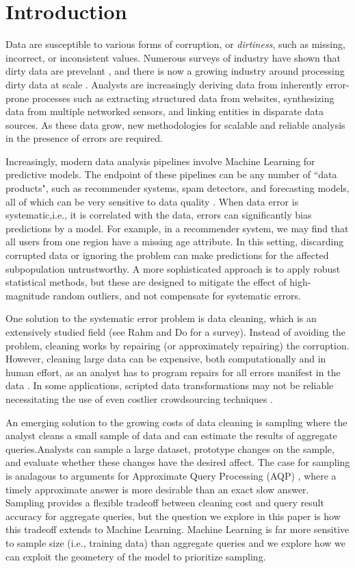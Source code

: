 \section{Introduction}
Data are susceptible to various forms of corruption, or \emph{dirtiness}, such as missing, incorrect, or inconsistent values.
Numerous surveys of industry have shown that dirty data are prevelant \cite{Gartner}, and there is now a growing industry around processing dirty data at scale \cite{fortunearticle}.
Analysts are increasingly deriving data from inherently error-prone processes such as extracting structured data from websites, synthesizing data from multiple networked sensors, and linking entities in disparate data sources.
As these data grow, new methodologies for scalable and reliable analysis in the presence of errors are required. 

Increasingly, modern data analysis pipelines involve Machine Learning for predictive models.
The endpoint of these pipelines can be any number of ``data products", such as recommender systems, spam detectors, and forecasting models, all of which can be very sensitive to data quality \cite{}.
When data error is systematic,i.e., it is correlated with the data, errors can significantly bias predictions by a model.
For example, in a recommender system, we may find that all users from one region have a missing age attribute.
In this setting, discarding corrupted data or ignoring the problem can make predictions for the affected subpopulation untrustworthy.
A more sophisticated approach is to apply robust statistical methods, but these are designed to mitigate the effect of high-magnitude random outliers, and not compensate for systematic errors.

One solution to the systematic error problem is data cleaning, which is an extensively studied field (see Rahm and Do \cite{rahm2000data} for a survey).
Instead of avoiding the problem, cleaning works by repairing (or approximately repairing) the corruption.
However, cleaning large data can be expensive, both computationally and in human effort, as an analyst has to program repairs for all errors manifest in the data \cite{kandel2012}.
In some applications, scripted data transformations may not be reliable necessitating the use of even costlier crowdsourcing techniques \cite{gokhale2014corleone,park2014crowdfill}.

An emerging solution to the growing costs of data cleaning is sampling \cite{wang1999sample} where the analyst cleans a small sample of data and can estimate the results of aggregate queries.Analysts can sample a large dataset, prototype changes on the sample, and evaluate whether these changes have the desired affect.
The case for sampling is analagous to arguments for Approximate Query Processing (AQP) \cite{DBLP:conf/eurosys/AgarwalMPMMS13}, where a timely approximate answer is more desirable than an exact slow answer.
Sampling provides a flexible tradeoff between cleaning cost and query result accuracy for aggregate queries, but the question we explore in this paper is how this tradeoff extends to Machine Learning. 
Machine Learning is far more sensitive to sample size (i.e., training data) than aggregate queries and we explore how we can exploit the geometery of the model to prioritize sampling.

